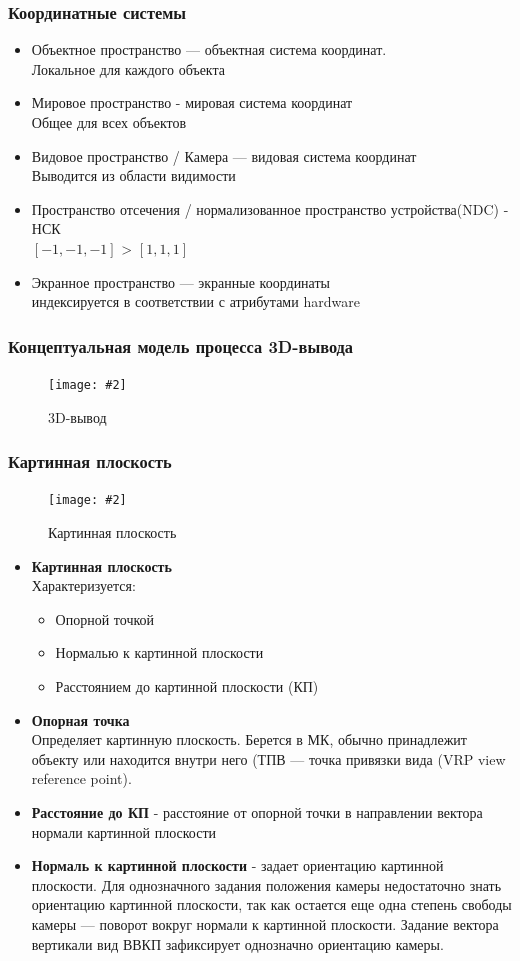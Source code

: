 \documentclass[a4paper, 14pt]{extarticle}
\newcommand{\screenshot}[3]{
	\begin{figure}[h]
		\centering
		\texttt{[image: \#2]}
		\caption{#3}
	\end{figure}
}
\begin{document}
\subsubsection{Координатные системы}
\begin{itemize}
	\item Объектное пространство — объектная система координат.\\
	Локальное для каждого объекта
	\item Мировое пространство - мировая система координат\\
	Общее для всех объектов
	\item Видовое пространство / Камера — видовая система координат\\
	Выводится из области видимости
	\item Пространство отсечения / нормализованное пространство устройства(NDC) - НСК\\
	$[-1,-1,-1]$ > $[1,1,1]$
	\item Экранное пространство — экранные координаты\\
	индексируется в соответствии с атрибутами hardware
\end{itemize}

\subsubsection{Концептуальная модель процесса 3D-вывода}
\screenshot{width=12cm}{l5/S033.jpg}{3D-вывод}

\FloatBarrier
\subsubsection{Картинная плоскость}
\screenshot{width=12cm}{l5/S034.jpg}{Картинная плоскость}
\begin{itemize}
	\item \textbf{Картинная плоскость} \\Характеризуется:
	\begin{itemize}
		\item Опорной точкой
		\item Нормалью к картинной плоскости
		\item Расстоянием до картинной плоскости (КП)
	\end{itemize}
	\item \textbf{Опорная точка}\\
	Определяет картинную плоскость. Берется в МК, обычно принадлежит объекту или находится внутри него (ТПВ — точка привязки вида (VRP view reference point).
	\item \textbf{Расстояние до КП} - расстояние от опорной точки в направлении вектора нормали картинной плоскости
	\item \textbf{Нормаль к картинной плоскости} - задает ориентацию картинной плоскости. Для однозначного задания положения камеры недостаточно знать ориентацию картинной плоскости, так как остается еще одна степень свободы камеры — поворот вокруг нормали к картинной плоскости. Задание вектора вертикали вид ВВКП зафиксирует однозначно ориентацию камеры.
\end{itemize}
\end{document}
